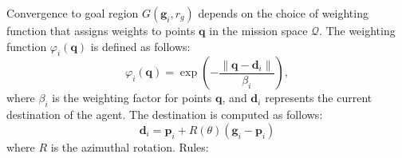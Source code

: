         Convergence to goal region $G(\mathbf{g}_i, r_g )$ depends on the choice of weighting function that assigns weights to points $\mathbf{q}$ in the mission space $\mathcal{Q}$.
        The weighting function $\varphi_i(\mathbf{q})$ is defined as follows: 
        \begin{equation}
            \varphi_i(\mathbf{q}) = \exp\left(-\frac{\|\mathbf{q} - \mathbf{d}_i\|}{\beta_i}\right),
        \end{equation}
        where $\beta_i$ is the weighting factor for points $\mathbf{q}$, and $\mathbf{d}_i$ represents the current destination of the agent. 
        The destination is computed as follows:
        \begin{equation}
            \mathbf{d}_i = \mathbf{p}_i + R(\theta)(\mathbf{g}_i - \mathbf{p}_i)
        \end{equation}
        where $R$ is the azimuthal rotation.
        Rules: 
